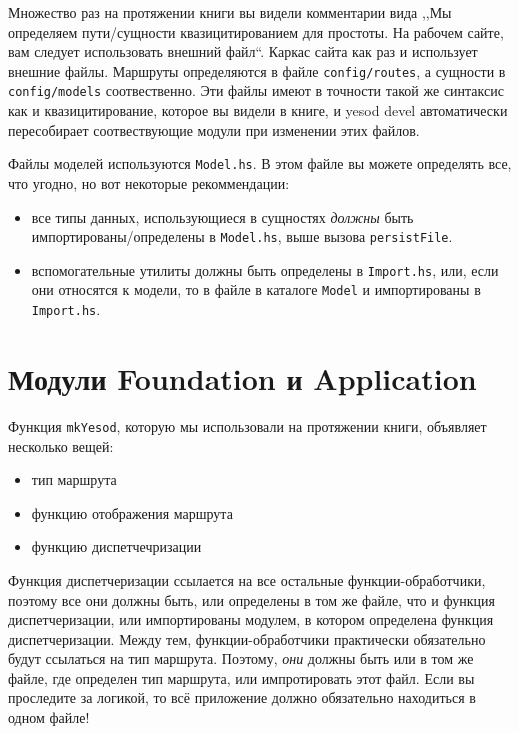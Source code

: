 Множество раз на протяжении книги вы видели комментарии вида ,,Мы определяем пути/сущности
квазицитированием для простоты. На рабочем сайте, вам следует использовать внешний файл``.
Каркас сайта как раз и использует внешние файлы.
Маршруты определяются в файле \lstinline!config/routes!, а сущности в \lstinline!config/models!
соотвественно. Эти файлы имеют в точности такой же синтаксис как и квазицитирование, которое вы
видели в книге, и yesod devel автоматически пересобирает соотвествующие модули при изменении этих файлов.

Файлы моделей используются \lstinline!Model.hs!. В этом файле вы можете определять все, что угодно, но
вот некоторые рекоммендации:
\begin{itemize}
    \item все типы данных, использующиеся в сущностях \emph{должны} быть импортированы/определены
      в \lstinline!Model.hs!, выше вызова \lstinline!persistFile!.
    \item вспомогательные утилиты должны быть определены в \lstinline!Import.hs!, или, если они
      относятся к модели, то в файле в каталоге \lstinline!Model! и импортированы в \lstinline!Import.hs!.
\end{itemize}

\section{Модули Foundation и Application}

Функция \lstinline!mkYesod!, которую мы использовали на протяжении книги, объявляет несколько вещей:

\begin{itemize}
  \item тип маршрута
  \item функцию отображения маршрута
  \item функцию диспетчечризации
\end{itemize}

Функция диспетчеризации ссылается на все остальные функции-обработчики, поэтому все они должны быть, 
или определены в том же файле, что и функция диспетчеризации, или импортированы модулем,
в котором определена функция диспетчеризации.
Между тем, функции-обработчики практически обязательно будут ссылаться на тип маршрута. Поэтому,
\emph{они} должны быть или в том же файле, где определен тип маршрута, или импротировать этот файл.
Если вы проследите за логикой, то всё приложение должно обязательно находиться в одном файле!

